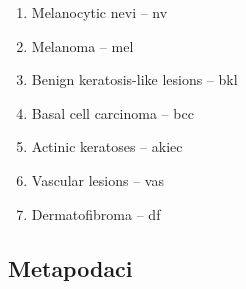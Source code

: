\documentclass[times, utf8, zavrsni]{fer}
\begin{document}
\begin{enumerate}
\item Melanocytic nevi -- nv
\item Melanoma -- mel
\item Benign keratosis-like lesions -- bkl
\item Basal cell carcinoma -- bcc
\item Actinic keratoses -- akiec
\item Vascular lesions -- vas
\item Dermatofibroma -- df
\end{enumerate}

\subsection*{Metapodaci}
\end{document}
